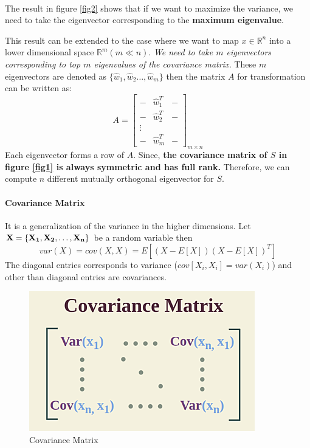 \documentclass[12pt,reqno]{amsart}
\theoremstyle{plain}
\theoremstyle{definition}
\begin{document}
\\ \par The result in figure \ref{fig2} shows that if we want to maximize the variance, we need to take the eigenvector corresponding to the {\bf maximum eigenvalue}. \par This result can be extended to the case where we want to map $x \in \mathbb{R}^n$ into a lower dimensional space $\mathbb{R}^m (m \ll n)$. {\it We need to take $m$ eigenvectors corresponding to top $m$ eigenvalues of the covariance matrix.} These $m$ eigenvectors are denoted as $\{\hat{w}_1, \hat{w}_2 \dots, \hat{w}_m\}$ then the matrix $A$ for transformation can be written as:
$$ A = \begin{bmatrix}
    - & \hat{w}^T_1 &- \\
    - & \hat{w}^T_2 & - \\
    \vdots \\
    - & \hat{w}^T_m & - 
\end{bmatrix}_{m \times n}
$$
Each eigenvector forms a row of $A$. Since, {\bf the covariance matrix of $S$ in figure \ref{fig1} is always symmetric and has full rank.} Therefore, we can compute $n$ different mutually orthogonal eigenvector for $S$. 
\paragraph{\bf Covariance Matrix} It is a generalization of the variance in the higher dimensions. Let ${\bf X = \{X_1, X_2, \dots, X_n\}}$ be a random variable then
$$ var(X) = cov(X,X) = E[(X-E[X])(X-E[X])^T] $$
The diagonal entries corresponds to variance ($cov[X_i,X_i] = var(X_i)$) and other than diagonal entries are covariances.
\begin{figure}[!ht]
    \centerline{\includegraphics[scale=.5]{ assets/covariance_matrix.png}}
    \caption{Covariance Matrix}
    \label{fig5}
\end{figure}
\end{document}
